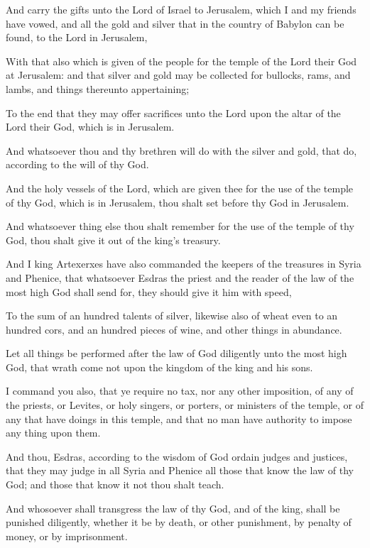 {\par }{\PP {}And carry the gifts unto the Lord of Israel to Jerusalem, which I and my friends have vowed, and all the gold and silver that in the country of Babylon can be found, to the Lord in Jerusalem,
\par }{\PP {}With that also which is given of the people for the temple of the Lord their God at Jerusalem: and that silver and gold may be collected for bullocks, rams, and lambs, and things thereunto appertaining;
\par }{\PP {}To the end that they may offer sacrifices unto the Lord upon the altar of the Lord their God, which is in Jerusalem.
\par }{\PP {}And whatsoever thou and thy brethren will do with the silver and gold, that do, according to the will of thy God.
\par }{\PP {}And the holy vessels of the Lord, which are given thee for the use of the temple of thy God, which is in Jerusalem, thou shalt set before thy God in Jerusalem.
\par }{\PP {}And whatsoever thing else thou shalt remember for the use of the temple of thy God, thou shalt give it out of the king’s treasury.
\par }{\PP {}And I king Artexerxes have also commanded the keepers of the treasures in Syria and Phenice, that whatsoever Esdras the priest and the reader of the law of the most high God shall send for, they should give it him with speed,
\par }{\PP {}To the sum of an hundred talents of silver, likewise also of wheat even to an hundred cors, and an hundred pieces of wine, and other things in abundance.
\par }{\PP {}Let all things be performed after the law of God diligently unto the most high God, that wrath come not upon the kingdom of the king and his sons.
\par }{\PP {}I command you also, that ye require no tax, nor any other imposition, of any of the priests, or Levites, or holy singers, or porters, or ministers of the temple, or of any that have doings in this temple, and that no man have authority to impose any thing upon them.
\par }{\PP {}And thou, Esdras, according to the wisdom of God ordain judges and justices, that they may judge in all Syria and Phenice all those that know the law of thy God; and those that know it not thou shalt teach.
\par }{\PP {}And whosoever shall transgress the law of thy God, and of the king, shall be punished diligently, whether it be by death, or other punishment, by penalty of money, or by imprisonment.
}
